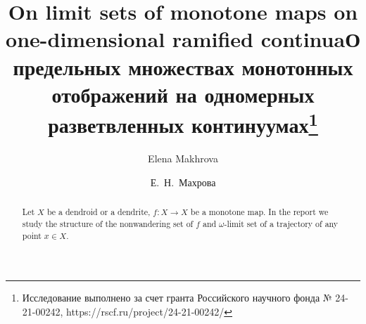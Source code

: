 \begin{englishtitle} %
\title{On limit sets of monotone maps on one-dimensional ramified continua}
\author{Elena Makhrova}




\maketitle

\begin{abstract}
Let $X$ be a dendroid or a dendrite, $f:X\to X$ be a monotone map. In the report we study the structure of the nonwandering set of $f$ and  $\omega$-limit set of a trajectory of any point $x\in X$.

\end{abstract}
\end{englishtitle}

\iffalse
\documentclass[12pt]{llncs}


\usepackage{iftex}

\ifPDFTeX
\usepackage[T2A]{fontenc}
\usepackage[utf8]{inputenc} %
\usepackage[english,russian]{babel}
\fi

\usepackage{todonotes}

\usepackage[russian]{nla}




\fi

\title{О предельных множествах монотонных отображений на одномерных разветвленных континуумах\thanks{Исследование выполнено за счет гранта Российского научного фонда № 24-21-00242, https://rscf.ru/project/24-21-00242/}}
\author{Е.~Н.~Махрова 
} %


\maketitle

